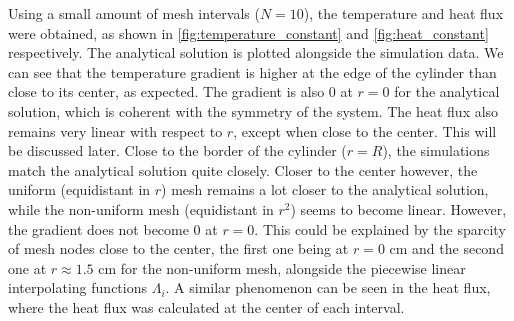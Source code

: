 Using a small amount of mesh intervals (\(N=10\)), the temperature and heat flux were obtained, as shown in \autoref{fig:temperature_constant} and \autoref{fig:heat_constant} respectively. The analytical solution is plotted alongside the simulation data. We can see that the temperature gradient is higher at the edge of the cylinder than close to its center, as expected. The gradient is also 0 at \(r=0\) for the analytical solution, which is coherent with the symmetry of the system. The heat flux also remains very linear with respect to \(r\), except when close to the center. This will be discussed later. Close to the border of the cylinder (\(r=R\)), the simulations match the analytical solution quite closely. Closer to the center however, the uniform (equidistant in \(r\)) mesh remains a lot closer to the analytical solution, while the non-uniform mesh (equidistant in \(r^2\)) seems to become linear. However, the gradient does not become 0 at \(r=0\). This could be explained by the sparcity of mesh nodes close to the center, the first one being at \(r=0\) \si{\centi\meter} and the second one at \(r \approx 1.5\) \si{\centi\meter} for the non-uniform mesh, alongside the piecewise linear interpolating functions \(\Lambda_i\). A similar phenomenon can be seen in the heat flux, where the heat flux was calculated at the center of each interval.

